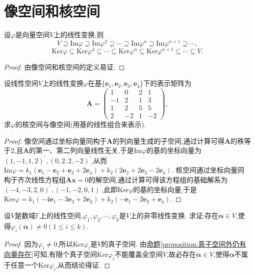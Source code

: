 \documentclass[../../main.tex]{subfiles}
\begin{document}
\section{像空间和核空间}

\begin{proposition}\label{proposition:像空间和核空间的子空间链}
设\(\varphi\)是向量空间\(V\)上的线性变换,则
\[
V\supseteq \mathrm{Im}\varphi \supseteq \mathrm{Im}\varphi^2 \supseteq \cdots \supseteq \mathrm{Im}\varphi^n \supseteq \mathrm{Im}\varphi^{n + 1} \supseteq \cdots,
\]
\[
\mathrm{Ker}\varphi \subseteq \mathrm{Ker}\varphi ^2\subseteq \cdots \subseteq \mathrm{Ker}\varphi ^n\subseteq \mathrm{Ker}\varphi ^{n+1}\subseteq \cdots \subseteq V.
\]
\end{proposition}
\begin{proof}
由像空间和核空间的定义易证.
\end{proof}

\begin{example}
设线性空间\(V\)上的线性变换\(\varphi\)在基\(\{\boldsymbol{e}_1,\boldsymbol{e}_2,\boldsymbol{e}_3,\boldsymbol{e}_4\}\)下的表示矩阵为
\[
\boldsymbol{A}=\begin{pmatrix}
1&0&2&1\\
-1&2&1&3\\
1&2&5&5\\
2&-2&1&-2
\end{pmatrix},
\]
求\(\varphi\)的核空间与像空间(用基的线性组合来表示).
\end{example}
\begin{proof}
像空间通过坐标向量同构于\(\boldsymbol{A}\)的列向量生成的子空间,通过计算可得\(\boldsymbol{A}\)的秩等于\(2\),且\(\boldsymbol{A}\)的第一、第二列向量线性无关,于是\(\text{Im}\varphi\)的基的坐标向量为\((1,-1,1,2)^\prime,(0,2,2,-2)^\prime\),从而\(\text{Im}\varphi = k_1(\boldsymbol{e}_1 - \boldsymbol{e}_2 + \boldsymbol{e}_3 + 2\boldsymbol{e}_4)+k_2(2\boldsymbol{e}_2 + 2\boldsymbol{e}_3 - 2\boldsymbol{e}_4)\). 核空间通过坐标向量同构于齐次线性方程组\(\boldsymbol{A}\boldsymbol{x}=0\)的解空间,通过计算可得该方程组的基础解系为\((-4,-3,2,0)^\prime,(-1,-2,0,1)^\prime\),此即\(\text{Ker}\varphi\)的基的坐标向量,于是\(\text{Ker}\varphi = k_1(-4\boldsymbol{e}_1 - 3\boldsymbol{e}_2 + 2\boldsymbol{e}_3)+k_2(-\boldsymbol{e}_1 - 2\boldsymbol{e}_2 + \boldsymbol{e}_4)\).
\end{proof}

\begin{proposition}\label{proposition:一组有限个非零线性变换一定存在非零像}
设\(V\)是数域\(\mathbb{F}\)上的线性空间,\(\varphi_1,\varphi_2,\cdots,\varphi_k\)是\(V\)上的非零线性变换. 求证:存在\(\boldsymbol{\alpha}\in V\),使得\(\varphi_i(\boldsymbol{\alpha})\neq 0(1\leqslant  i\leqslant  k)\).
\end{proposition}
\begin{proof}
因为\(\varphi_i\neq 0\),所以\(\text{Ker}\varphi_i\)是\(V\)的真子空间. 由\hyperref[proposition:真子空间外仍有向量存在]{命题\ref{proposition:真子空间外仍有向量存在}}可知,有限个真子空间\(\text{Ker}\varphi_i\)不能覆盖全空间\(V\),故必存在\(\boldsymbol{\alpha}\in V\),使得\(\boldsymbol{\alpha}\)不属于任意一个\(\text{Ker}\varphi_i\),从而结论得证.
\end{proof}
\end{document}
